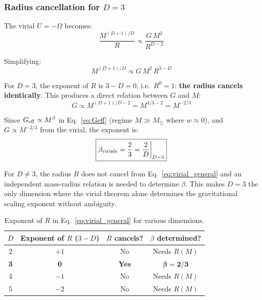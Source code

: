 \documentclass[10pt,a4paper]{article}
\begin{document}
\subsubsection{Radius cancellation for $D = 3$}

The virial $U = -\Omega$ becomes:
\begin{equation}
\frac{M^{(D+1)/D}}{R} \propto \frac{G\,M^2}{R^{D-2}}
\end{equation}

Simplifying:
\begin{equation}\label{eq:virial_general}
M^{(D+1)/D} \propto G\,M^2\,R^{3-D}
\end{equation}

For $D = 3$, the exponent of $R$ is $3 - D = 0$, i.e.\ $R^0 = 1$: \textbf{the radius cancels identically}. This produces a direct relation between $G$ and $M$:
\begin{equation}
G \propto M^{(D+1)/D - 2} = M^{4/3 - 2} = M^{-2/3}
\end{equation}

Since $G_{\rm eff} \propto M^\beta$ in Eq.~\ref{eq:Geff} (regime $M \gg M_\odot$ where $w \approx 0$), and $G \propto M^{-2/3}$ from the virial, the exponent is:
\begin{equation}
\boxed{\beta_{\rm viriale} = \frac{2}{3} = \frac{2}{D}\bigg|_{D=3}}
\end{equation}

For $D \neq 3$, the radius $R$ does not cancel from Eq.~\ref{eq:virial_general} and an independent mass-radius relation is needed to determine $\beta$. This makes $D = 3$ the only dimension where the virial theorem alone determines the gravitational scaling exponent without ambiguity.

\begin{table}[h]
\centering
\caption{Exponent of $R$ in Eq.~\ref{eq:virial_general} for various dimensions.}\label{tab:virial}
\begin{tabular}{cccc}
\toprule
$D$ & Exponent of $R$ ($3-D$) & $R$ cancels? & $\beta$ determined? \\
\midrule
2 & $+1$ & No & Needs $R(M)$ \\
\textbf{3} & \textbf{0} & \textbf{Yes} & $\boldsymbol{\beta = 2/3}$ \\
4 & $-1$ & No & Needs $R(M)$ \\
5 & $-2$ & No & Needs $R(M)$ \\
\bottomrule
\end{tabular}
\end{table}
\end{document}
